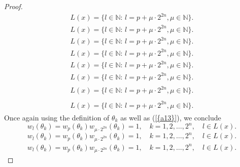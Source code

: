 \documentclass{amsart}
\numberwithin{equation}{section}
\begin{document}
\begin{proof}
{\begin{align*}
L(x)=\{l\in{\ensuremath{\mathbb N}}:\, l=p+\mu\cdot2^{2n}, \mu \in {\ensuremath{\mathbb N}}\}.
\end{align*}\fi   
{}\begin{align}\label{a6}
L(x)=\{l\in{\ensuremath{\mathbb N}}:\, l=p+\mu\cdot2^{2n}, \mu \in {\ensuremath{\mathbb N}}\}.
\end{align}\fi    
{}\begin{gather*}\label{a6}
L(x)=\{l\in{\ensuremath{\mathbb N}}:\, l=p+\mu\cdot2^{2n}, \mu \in {\ensuremath{\mathbb N}}\}.
\end{gather*}\fi  
{}\begin{gather}\label{a6}
L(x)=\{l\in{\ensuremath{\mathbb N}}:\, l=p+\mu\cdot2^{2n}, \mu \in {\ensuremath{\mathbb N}}\}.
\end{gather}\fi   
{}\begin{multline*}\label{a6}
L(x)=\{l\in{\ensuremath{\mathbb N}}:\, l=p+\mu\cdot2^{2n}, \mu \in {\ensuremath{\mathbb N}}\}.
\end{multline*}\fi  
{}\begin{multline}\label{a6}
L(x)=\{l\in{\ensuremath{\mathbb N}}:\, l=p+\mu\cdot2^{2n}, \mu \in {\ensuremath{\mathbb N}}\}.
\end{multline}\fi  
{}\begin{multline*}\begin{split}\label{a6}
L(x)=\{l\in{\ensuremath{\mathbb N}}:\, l=p+\mu\cdot2^{2n}, \mu \in {\ensuremath{\mathbb N}}\}.
\end{split}\end{multline*}\fi
{}\begin{multline}\begin{split}\label{a6}
L(x)=\{l\in{\ensuremath{\mathbb N}}:\, l=p+\mu\cdot2^{2n}, \mu \in {\ensuremath{\mathbb N}}\}.
\end{split}\end{multline}\fi
}
Once again using the definition of $\theta_k$ as well as {(\ref{{a13}})}, we conclude
{
\begin{equation*} \label{a14}
w_l(\theta_k)=w_p(\theta_k)w_{\mu\cdot 2^{2n}}(\theta_k)=1,\quad k=1,2,\ldots,2^n,\quad l\in L(x).
 \end{equation*}\fi  
{}\begin{equation}\label{a14}
w_l(\theta_k)=w_p(\theta_k)w_{\mu\cdot 2^{2n}}(\theta_k)=1,\quad k=1,2,\ldots,2^n,\quad l\in L(x).
\end{equation}\fi   
{}\begin{align*}\label{a14}
w_l(\theta_k)=w_p(\theta_k)w_{\mu\cdot 2^{2n}}(\theta_k)=1,\quad k=1,2,\ldots,2^n,\quad l\in L(x).

\end{align*}}
\end{proof}
\end{document}
